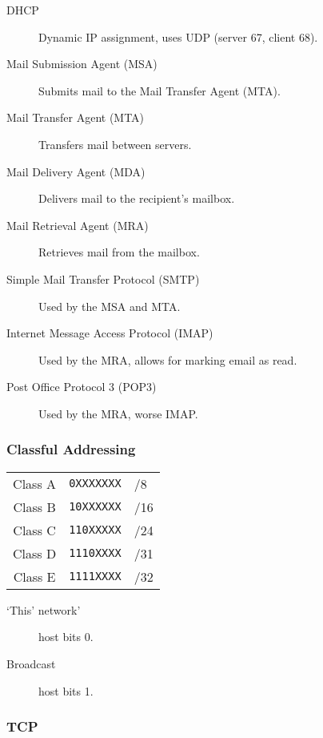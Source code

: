 \documentclass[10pt]{extarticle}
\begin{document}
\vspace*{-1em}
\begin{multicols}{2}
  \begin{description}
    \item[DHCP] Dynamic IP assignment, uses UDP (server 67, client 68).
    \item[Mail Submission Agent (MSA)] Submits mail to the Mail Transfer Agent (MTA).
    \item[Mail Transfer Agent (MTA)] Transfers mail between servers.
    \item[Mail Delivery Agent (MDA)] Delivers mail to the recipient's mailbox.
    \item[Mail Retrieval Agent (MRA)] Retrieves mail from the mailbox.
    \item[Simple Mail Transfer Protocol (SMTP)] Used by the MSA and MTA.
    \item[Internet Message Access Protocol (IMAP)] Used by the MRA, allows for
          marking email as read.
    \item[Post Office Protocol 3 (POP3)] Used by the MRA, worse IMAP.
  \end{description}


  \begin{multicols}{2}
    \subsubsection*{Classful Addressing}
    \small
    \begin{tabular}{c|c|l}
      Class A & \texttt{0XXXXXXX} & /8  \\
      Class B & \texttt{10XXXXXX} & /16 \\
      Class C & \texttt{110XXXXX} & /24 \\
      Class D & \texttt{1110XXXX} & /31 \\
      Class E & \texttt{1111XXXX} & /32 \\
    \end{tabular}
    \begin{description}
      \item[`This' network'] host bits 0.
      \item[Broadcast] host bits 1.
    \end{description}
    \normalsize
    \columnbreak
    \subsubsection*{TCP}
    \hspace*{-3em}
\end{multicols}
\end{multicols}
\end{document}
